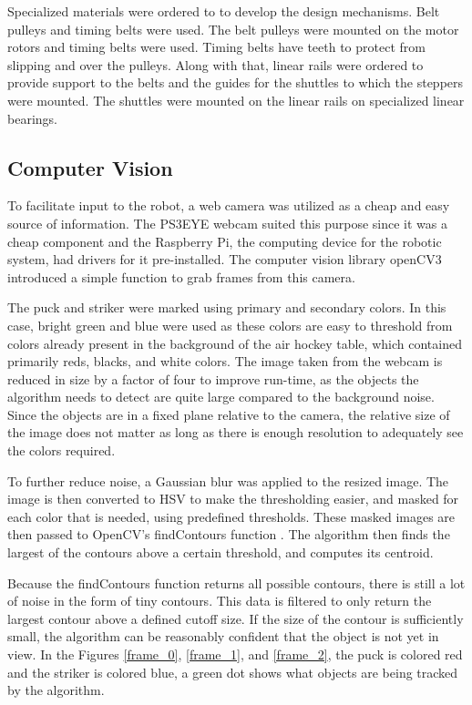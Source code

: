 \documentclass[letterpaper, 12 pt, conference]{ieeeconf}
\begin{document}
Specialized materials were ordered to to develop the design mechanisms. Belt pulleys and timing belts were used. The belt pulleys were mounted on the motor rotors and timing belts were used. Timing belts have teeth to protect from slipping and over the pulleys. Along with that, linear rails were ordered to provide support to the belts and the guides for the shuttles to which the steppers were mounted. The shuttles were mounted on the linear rails on specialized linear bearings.

\subsection{Computer Vision}
\label{design-computervision}
To facilitate input to the robot, a web camera was utilized as a cheap and easy source of information. The PS3EYE webcam suited this purpose since it was a cheap component and the Raspberry Pi, the computing device for the robotic system, had drivers for it pre-installed. The computer vision library openCV3 \cite{opencv} introduced a simple function to grab frames from this camera. 

The puck and striker were marked using primary and secondary colors. In this case, bright green and blue were used as these colors are easy to threshold from colors already present in the background of the air hockey table, which contained primarily reds, blacks, and white colors. The image taken from the webcam is reduced in size by a factor of four to improve run-time, as the objects the algorithm needs to detect are quite large compared to the background noise. Since the objects are in a fixed plane relative to the camera, the relative size of the image does not matter as long as there is enough resolution to adequately see the colors required. 

To further reduce noise, a Gaussian blur was applied to the resized image. The image is then converted to HSV to make the thresholding easier, and masked for each color that is needed, using predefined thresholds. These masked images are then passed to OpenCV’s findContours function \cite{opencv}. The algorithm then finds the largest of the contours above a certain threshold, and computes its centroid.

Because the findContours function returns all possible contours, there is still a lot of noise in the form of tiny contours. This data is filtered to only return the largest contour above a defined cutoff size. If the size of the contour is sufficiently small, the algorithm can be reasonably confident that the object is not yet in view. In the Figures \ref{frame_0}, \ref{frame_1}, and \ref{frame_2}, the puck is colored red and the striker is colored blue, a green dot shows what objects are being tracked by the algorithm.
\end{document}
